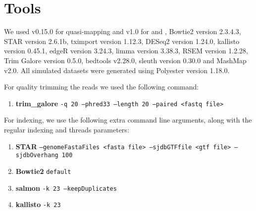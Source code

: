\section{Tools}
\label{subsec:commands}
We used \salmon v0.15.0 for quasi-mapping and \salmon v1.0 for \hsa and \saf, Bowtie2 version 2.3.4.3, STAR version 2.6.1b, tximport
version 1.12.3, DESeq2 version 1.24.0, kallisto version 0.45.1, edgeR version 3.24.3, limma version 3.38.3, 
RSEM version 1.2.28, Trim Galore version 0.5.0, bedtools v2.28.0, sleuth version 0.30.0 and
MashMap v2.0. All simulated datasets were generated using Polyester version 1.18.0.

For quality trimming the reads we used the following command:
\raggedright
\begin{enumerate}
\item \textbf{trim\_galore} \texttt{-q 20 --phred33 --length 20 --paired <fastq file>}
\end{enumerate}

For indexing, we use the following extra command line arguments, along with the regular
indexing and threads parameters:
\begin{enumerate}
\item \textbf{STAR} \texttt{--genomeFastaFiles <fasta file> --sjdbGTFfile <gtf file> --sjdbOverhang 100}
\item \textbf{Bowtie2} \texttt{default}
\item \textbf{salmon} \texttt{-k 23 --keepDuplicates}
\item \textbf{kallisto} \texttt{-k 23}
\end{enumerate}

